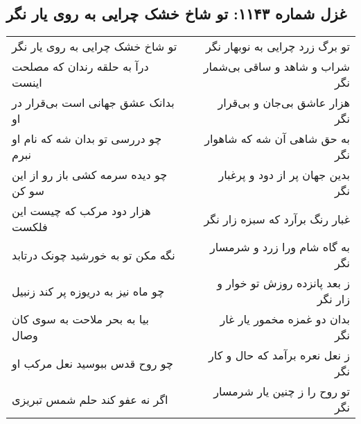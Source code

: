 \begin{center}
\section*{غزل شماره ۱۱۴۳: تو شاخ خشک چرایی به روی یار نگر}
\label{sec:1143}
\begin{longtable}{l p{0.5cm} r}
تو شاخ خشک چرایی به روی یار نگر
&&
تو برگ زرد چرایی به نوبهار نگر
\\
درآ به حلقه رندان که مصلحت اینست
&&
شراب و شاهد و ساقی بی‌شمار نگر
\\
بدانک عشق جهانی است بی‌قرار در او
&&
هزار عاشق بی‌جان و بی‌قرار نگر
\\
چو دررسی تو بدان شه که نام او نبرم
&&
به حق شاهی آن شه که شاهوار نگر
\\
چو دیده سرمه کشی باز رو از این سو کن
&&
بدین جهان پر از دود و پرغبار نگر
\\
هزار دود مرکب که چیست این فلکست
&&
غبار رنگ برآرد که سبزه زار نگر
\\
نگه مکن تو به خورشید چونک درتابد
&&
به گاه شام ورا زرد و شرمسار نگر
\\
چو ماه نیز به دریوزه پر کند زنبیل
&&
ز بعد پانزده روزش تو خوار و زار نگر
\\
بیا به بحر ملاحت به سوی کان وصال
&&
بدان دو غمزه مخمور یار غار نگر
\\
چو روح قدس ببوسید نعل مرکب او
&&
ز نعل نعره برآمد که حال و کار نگر
\\
اگر نه عفو کند حلم شمس تبریزی
&&
تو روح را ز چنین یار شرمسار نگر
\\
\end{longtable}
\end{center}
